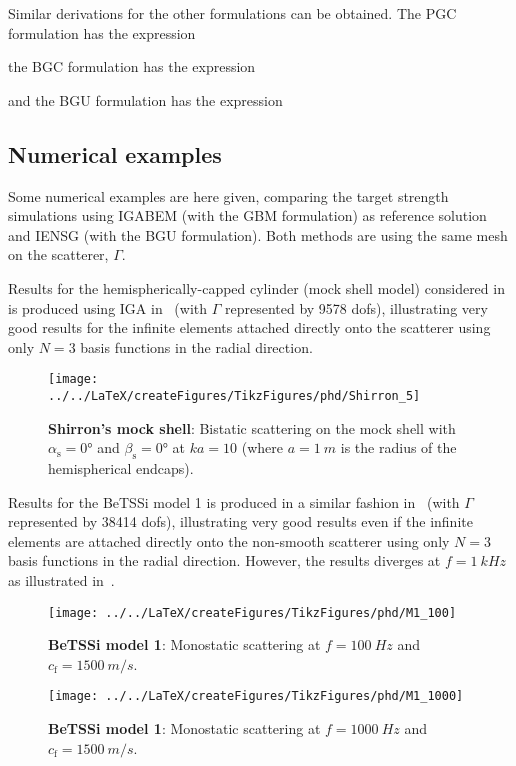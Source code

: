 Similar derivations for the other formulations can be obtained. The PGC formulation has the expression

the BGC formulation has the expression

and the BGU formulation has the expression


\subsection{Numerical examples}
Some numerical examples are here given, comparing the target strength simulations using IGABEM (with the GBM formulation) as reference solution and IENSG (with the BGU formulation). Both methods are using the same mesh on the scatterer, $\Gamma$.

Results for the hemispherically-capped cylinder (mock shell model) considered in~\cite[Fig. 10]{Shirron2002aie} is produced using IGA in~ (with $\Gamma$ represented by \num{9578} dofs), illustrating very good results for the infinite elements attached directly onto the scatterer using only $N=3$ basis functions in the radial direction.
\begin{figure}
	\centering
	\texttt{[image: ../../LaTeX/createFigures/TikzFigures/phd/Shirron\_5]}
	\caption{\textbf{Shirron's mock shell}: Bistatic scattering on the mock shell with $\alpha_{\mathrm{s}} = \ang{0}$ and $\beta_{\mathrm{s}} = \ang{0}$ at $ka=10$ (where $a=\SI{1}{m}$ is the radius of the hemispherical endcaps).}
	\label{Fig3:Shirron}
\end{figure}
Results for the BeTSSi model 1 is produced in a similar fashion in~ (with $\Gamma$ represented by \num{38414} dofs), illustrating very good results even if the infinite elements are attached directly onto the non-smooth scatterer using only $N=3$ basis functions in the radial direction. However, the results diverges at $f=\SI{1}{kHz}$ as illustrated in~.
\begin{figure}
	\centering
	\texttt{[image: ../../LaTeX/createFigures/TikzFigures/phd/M1\_100]}
	\caption{\textbf{BeTSSi model 1}: Monostatic scattering at $f=\SI{100}{Hz}$ and $c_{\mathrm{f}}=\SI{1500}{m/s}$.}
	\label{Fig3:M1_IENSG_100}
\end{figure}
\begin{figure}
	\centering
	\texttt{[image: ../../LaTeX/createFigures/TikzFigures/phd/M1\_1000]}
	\caption{\textbf{BeTSSi model 1}: Monostatic scattering at $f=\SI{1000}{Hz}$ and $c_{\mathrm{f}}=\SI{1500}{m/s}$.}
	\label{Fig3:M1_IENSG_1000}
\end{figure}

